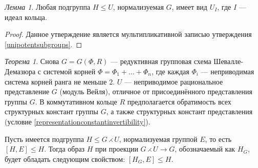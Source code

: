 \documentclass[10pt]{article}
\theoremstyle{remark}
\newtheorem{thm}{Теорема}
\newtheorem{lm}{Лемма}
\renewcommand{\le}{\leqslant}
\begin{document}
\begin{lm}\label{unipotenttransitivity}
  Любая подгруппа $H \le U$, нормализуемая $G$, имеет вид $U_I$, где $I$ --- идеал кольца.
\end{lm}
\begin{proof}
  Данное утверждение является мультипликативной записью утверждения \ref{unipotentsubgroups}.
\end{proof}

\begin{thm}
  Снова $G = G(\Phi, R)$ --- редуктивная групповая схема Шевалле-Демазюра
  с системой корней $\Phi = \Phi_1 + \ldots + \Phi_n$, где каждая $\Phi_i$ --- неприводимая система корней ранга не меньше $2$. $U$ --- неприводимое рациональное представление $G$ (модуль Вейля), отличное от присоединённого представления группы $G$. В коммутативном кольце $R$ предполагается обратимость всех структурных констант группы $G$, а также структурных констант представления (условие \ref{representationconstantinvertibility}).
    
  Пусть имеется подгруппа $H \le G \rightthreetimes U$, нормализуемая группой $E$, то есть $[H,E] \le H$. Тогда образ $H$ при проекции $G \rightthreetimes U \rightarrow G$, обозначаемый как $H_G$, будет обладать следующим свойством: $[H_G,E]\le H$.
\end{thm}
\end{document}
